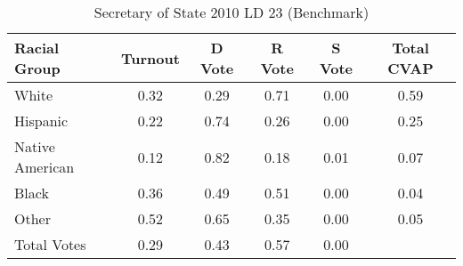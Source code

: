 \begin{table}[htb]
\begin{center}
\caption{Secretary of State 2010 LD 23 (Benchmark)}
\label{sos10_cvap_ld_23_benchmark}
\begin{tabular}{lccccc}
  \hline
Racial Group & Turnout & D Vote & R Vote & S Vote & Total CVAP \\ 
  \hline
White & 0.32 & 0.29 & 0.71 & 0.00 & 0.59 \\ 
  Hispanic & 0.22 & 0.74 & 0.26 & 0.00 & 0.25 \\ 
  Native American & 0.12 & 0.82 & 0.18 & 0.01 & 0.07 \\ 
  Black & 0.36 & 0.49 & 0.51 & 0.00 & 0.04 \\ 
  Other & 0.52 & 0.65 & 0.35 & 0.00 & 0.05 \\ 
  Total Votes & 0.29 & 0.43 & 0.57 & 0.00 &  \\ 
   \hline
\end{tabular}
\end{center}
\end{table}
